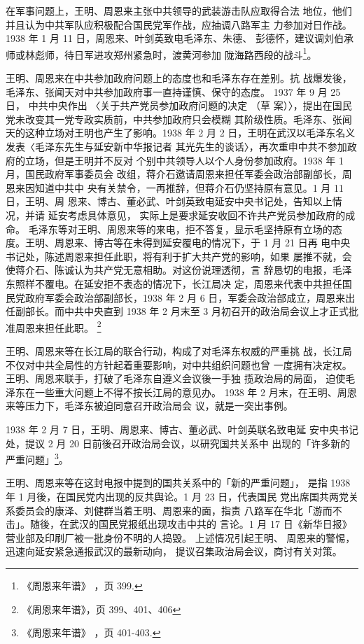 在军事问题上，王明、周恩来主张中共领导的武装游击队应取得合法
地位，他们并且认为中共军队应积极配合国民党军作战，应抽调八路军主
力参加对日作战。1938 年 1 月 11 日，周恩来、叶剑英致电毛泽东、朱德、
彭德怀，建议调刘伯承师或林彪师，待日军进攻郑州紧急时，渡黄河参加
陇海路西段的战斗\footnote{《周恩来年谱》
，页 399.}。

王明、周恩来在中共参加政府问题上的态度也和毛泽东存在差别。抗
战爆发後，毛泽东、张闻天对中共参加政府事一直持谨慎、保守的态度。
1937 年 9 月 25 日，
中共中央作出
〈关于共产党员参加政府问题的决定
（草
案）〉，提出在国民党未改变其一党专政实质前，中共参加政府只会模糊
其阶级性质。毛泽东、张闻天的这种立场对王明也产生了影响。1938 年 2
月 2 日，王明在武汉以毛泽东名义发表〈毛泽东先生与延安新中华报记者
其光先生的谈话〉，再次重申中共不参加政府的立场，但是王明并不反对
个别中共领导人以个人身份参加政府。1938 年 1 月，国民政府军事委员会
改组，蒋介石邀请周恩来担任军委会政治部副部长，周恩来因知道中共中
央有关禁令，一再推辞，但蒋介石仍坚持原有意见。1 月 11 日，王明、周
恩来、博古、董必武、叶剑英致电延安中央书记处，告知以上情况，并请
延安考虑具体意见，
实际上是要求延安收回不许共产党员参加政府的成命。
毛泽东等对王明、周恩来等的来电，拒不答复，显示毛坚持原有立场的态
度。王明、周恩来、博古等在未得到延安覆电的情况下，于 1 月 21 日再
电中央书记处，陈述周恩来担任此职，将有利于扩大共产党的影响，如果
屡推不就，会使蒋介石、陈诚认为共产党无意相助。对这份说理透彻，言
辞恳切的电报，毛泽东照样不覆电。在延安拒不表态的情况下，长江局决
定，周恩来代表中共担任国民党政府军委会政治部副部长，1938 年 2 月 6
日，军委会政治部成立，周恩来出任副部长。而中共中央直到 1938 年 2
月末至 3 月初召开的政治局会议上才正式批准周恩来担任此职。
\footnote{《周恩来年谱》，页 399、401、406 }

王明、周恩来等在长江局的联合行动，构成了对毛泽东权威的严重挑
 战，长江局不仅对中共全局性的方针起着重要影响，对中共组织问题也曾
一度拥有决定权。王明、周恩来联手，打破了毛泽东自遵义会议後一手独
揽政治局的局面，
迫使毛泽东在一些重大问题上不得不按长江局的意见办。
1938 年 2 月末，在王明、周恩来等压力下，毛泽东被迫同意召开政治局会
议，就是一突出事例。

1938 年 2 月 7 日，王明、周恩来、博古、董必武、叶剑英联名致电延
安中央书记处，提议 2 月 20 日前後召开政治局会议，以研究国共关系中
出现的「许多新的严重问题」\footnote{《周恩来年谱》
，页 401-403.}。

王明、周恩来等在这封电报中提到的国共关系中的「新的严重问题」，
是指 1938 年 1 月後，在国民党内出现的反共舆论。1 月 23 日，代表国民
党出席国共两党关系委员会的康泽、刘健群当着王明、周恩来的面，指责
八路军在华北「游而不击」。随後，在武汉的国民党报纸出现攻击中共的
言论。1 月 17 日《新华日报》营业部及印刷厂被一批身份不明的人捣毁。
上述情况引起王明、
周恩来的警惕，
迅速向延安紧急通报武汉的最新动向，
提议召集政治局会议，商讨有关对策。

